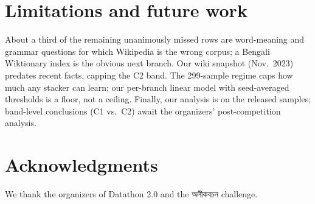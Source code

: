 \documentclass[11pt]{article}
\newcommand{\bn}[1]{{\bengalifont #1}}
\begin{document}
\section{Limitations and future work}

About a third of the remaining unanimously missed rows are word-meaning and
grammar questions for which Wikipedia is the wrong corpus; a Bengali
Wiktionary index is the obvious next branch. Our wiki snapshot (Nov.\ 2023)
predates recent facts, capping the C2 band. The 299-sample regime caps how
much any stacker can learn; our per-branch linear model with
seed-averaged thresholds is a floor, not a ceiling. Finally, our analysis is
on the released samples; band-level conclusions (C1 vs.\ C2) await the
organizers' post-competition analysis.

\section*{Acknowledgments}
We thank the organizers of Datathon 2.0 and the \bn{অলীকবচন} challenge.


\end{document}

